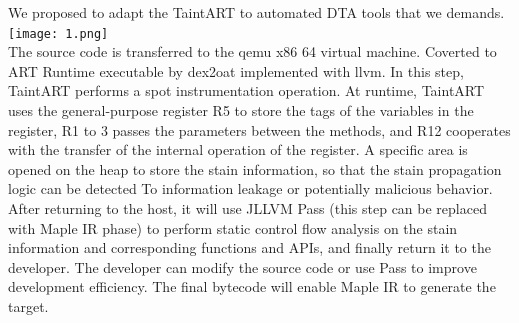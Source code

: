\documentclass[
    ngerman,american
    ]{scrartcl}
\newcommand{\lang}{en}
\begin{document}
\begin{description}[style=unboxed]
            \item [\questionThree{\lang}]
                We proposed to adapt the TaintART to automated DTA tools that we demands. \\
                \texttt{[image: 1.png]}\\
                The source code is transferred to the qemu x86 64 virtual machine. Coverted to ART Runtime executable by dex2oat
                implemented with llvm. In this step, TaintART performs a spot instrumentation operation. At runtime, TaintART uses the general-purpose register R5 to store the tags of the variables in the register, R1 to 3 passes the parameters between the methods, and R12 cooperates with the transfer of the internal operation of the register. A specific area is opened on the heap to store the stain information, so that the stain propagation logic can be detected To information leakage or potentially malicious behavior. After returning to the host, it will use JLLVM Pass (this step can be replaced with Maple IR phase) to perform static control flow analysis on the stain information and corresponding functions and APIs, and finally return it to the developer. The developer can modify the source code or use Pass to improve development efficiency. The final bytecode will enable Maple IR to generate the target.\\

\end{description}
\end{document}
